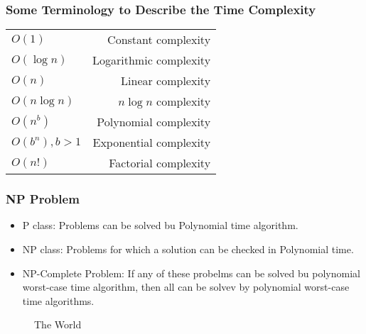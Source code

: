 \subsubsection{Some Terminology to Describe the Time Complexity}

\begin{center}
    \tabletail{\hline}
    \tablelasttail{\hline}
    \begin{supertabular}{|l|r|}
        $O(1)$      &Constant complexity\\
        $O(\log n )$&Logarithmic complexity\\
        $O(n)$      &Linear complexity\\
        $O(n\log n)$&$n \log n$ complexity\\
        $O(n^b)$    &Polynomial complexity\\
        $O(b^n),b>1$&Exponential complexity\\
        $O(n!)$     &Factorial complexity\\ 
    \end{supertabular}
\end{center}

\subsubsection{NP Problem}
\begin{itemize}
    \item P class: Problems can be solved bu Polynomial time algorithm. 
    \item NP class: Problems for which a solution can be checked in Polynomial time. 
    \item NP-Complete Problem: If any of these probelms can be solved bu polynomial worst-case time algorithm, then all can be solvev by polynomial worst-case time algorithms.
\end{itemize}

\begin{figure}[H]
    \centering
    \caption{The World}
\end{figure}

